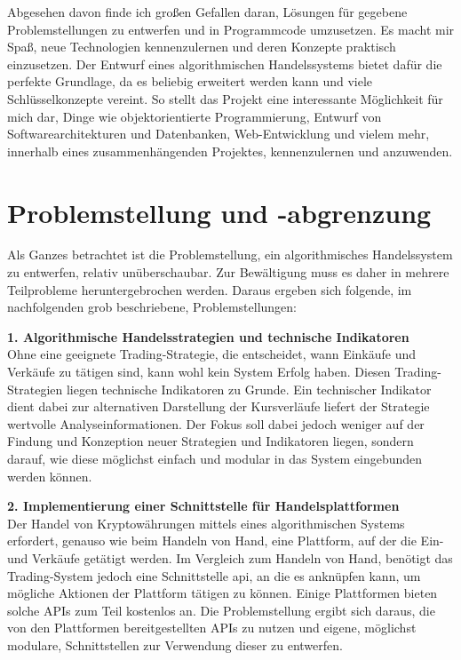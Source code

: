 \documentclass[oneside]{ausarbeitung}
\begin{document}
Abgesehen davon finde ich großen Gefallen daran, Lösungen für gegebene Problemstellungen zu entwerfen und in Programmcode umzusetzen. Es macht mir Spaß, neue Technologien kennenzulernen und deren Konzepte praktisch einzusetzen. Der Entwurf eines algorithmischen Handelssystems bietet dafür die perfekte Grundlage, da es beliebig erweitert werden kann und viele Schlüsselkonzepte vereint. So stellt das Projekt eine interessante Möglichkeit für mich dar, Dinge wie objektorientierte Programmierung, Entwurf von Softwarearchitekturen und Datenbanken, Web-Entwicklung und vielem mehr, innerhalb eines zusammenhängenden Projektes, kennenzulernen und anzuwenden.

\section{Problemstellung und -abgrenzung}
\label{sec:problemstellung}

Als Ganzes betrachtet ist die Problemstellung, ein algorithmisches Handelssystem zu entwerfen, relativ unüberschaubar. Zur Bewältigung muss es daher in mehrere Teilprobleme heruntergebrochen werden. Daraus ergeben sich folgende, im nachfolgenden grob beschriebene, Problemstellungen:

\textbf{1. Algorithmische Handelsstrategien und technische Indikatoren} \\
Ohne eine geeignete Trading-Strategie, die entscheidet, wann Einkäufe und Verkäufe zu tätigen sind, kann wohl kein System Erfolg haben. Diesen Trading-Strategien liegen technische Indikatoren zu Grunde. Ein technischer Indikator dient dabei zur alternativen Darstellung der Kursverläufe liefert der Strategie wertvolle Analyseinformationen. Der Fokus soll dabei jedoch weniger auf der Findung und Konzeption neuer Strategien und Indikatoren liegen, sondern darauf, wie diese möglichst einfach und modular in das System eingebunden werden können.

\textbf{2. Implementierung einer Schnittstelle für Handelsplattformen} \\
Der Handel von Kryptowährungen mittels eines algorithmischen Systems erfordert, genauso wie beim Handeln von Hand, eine Plattform, auf der die Ein- und Verkäufe getätigt werden. Im Vergleich zum Handeln von Hand, benötigt das Trading-System jedoch eine Schnittstelle \ac{api}, an die es anknüpfen kann, um mögliche Aktionen der Plattform tätigen zu können. Einige Plattformen bieten solche APIs zum Teil kostenlos an. Die Problemstellung ergibt sich daraus, die von den Plattformen bereitgestellten APIs zu nutzen und eigene, möglichst modulare, Schnittstellen zur Verwendung dieser zu entwerfen.
\end{document}
